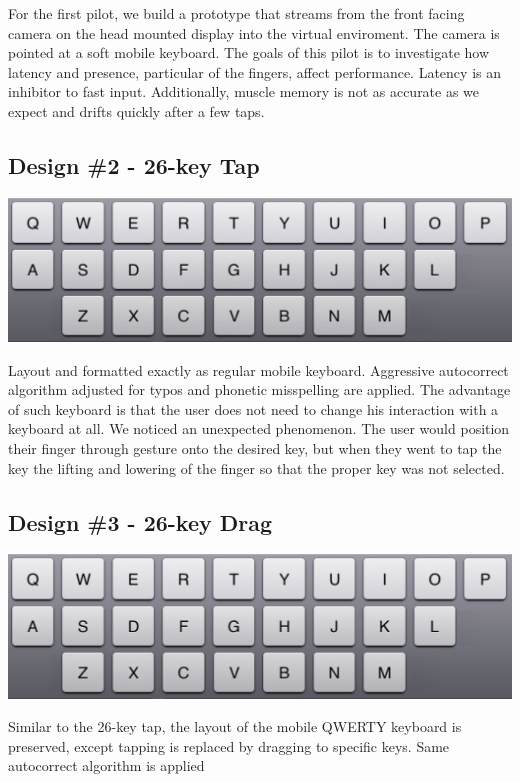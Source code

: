 \documentclass{sigchi}
\begin{document}
For the first pilot, we build a prototype that streams from the front facing camera on the head mounted display into the virtual enviroment.
The camera is pointed at a soft mobile keyboard.
The goals of this pilot is to investigate how latency and presence, particular of the fingers, affect performance.
Latency is an inhibitor to fast input.
Additionally, muscle memory is not as accurate as we expect and drifts quickly after a few taps.

\subsection{Design \#2 - 26-key Tap}
\vspace*{.1cm}
\includegraphics[width=.9\columnwidth]{figures/26Tap}

Layout and formatted exactly as regular mobile keyboard.
Aggressive autocorrect algorithm adjusted for typos and phonetic misspelling are applied.
The advantage of such keyboard is that the user does not need to change his interaction with a keyboard at all.
We noticed an unexpected phenomenon.
The user would  position their finger through gesture onto the desired key, but when they went to tap the key the lifting and lowering of the finger so that the proper key was not selected. 


\subsection{Design \#3 - 26-key Drag}
\vspace*{.1cm}
\includegraphics[width=.9\columnwidth]{figures/26Tap}

Similar to the 26-key tap, the layout of the mobile QWERTY keyboard is preserved, except tapping is replaced by dragging to specific keys.
Same autocorrect algorithm is applied
\end{document}
